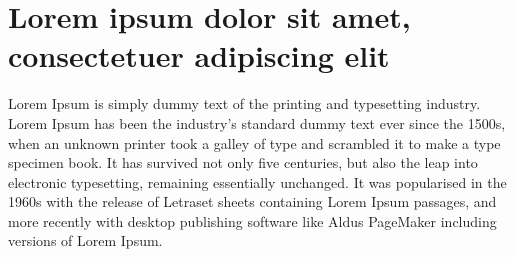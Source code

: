 \documentclass[             fontsize=12pt,
                             a4paper,                  
                             numbers=noenddot,
                             headings=big]
                            {scrreprt}
\begin{document}
\setcounter{chapter}{23}

\chapter{Lorem ipsum dolor sit amet, consectetuer adipiscing elit}
Lorem Ipsum is simply dummy text of the printing and typesetting industry. Lorem Ipsum has been the industry's standard dummy text ever since the 1500s, when an unknown printer took a galley of type and scrambled it to make a type specimen book. It has survived not only five centuries, but also the leap into electronic typesetting, remaining essentially unchanged. It was popularised in the 1960s with the release of Letraset sheets containing Lorem Ipsum passages, and more recently with desktop publishing software like Aldus PageMaker including versions of Lorem Ipsum.
\end{document}

